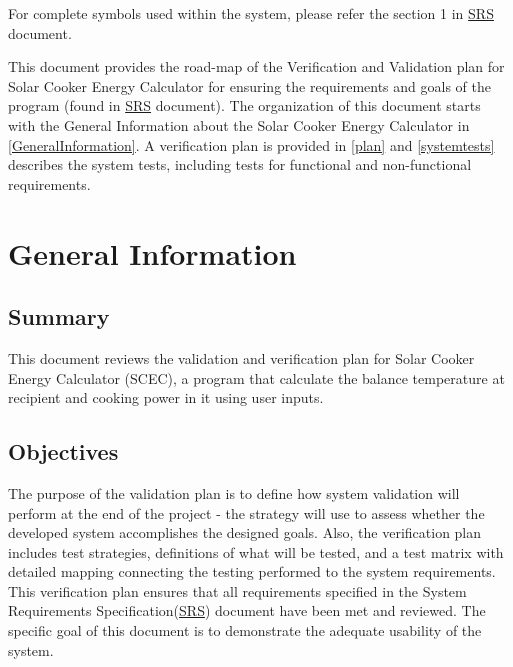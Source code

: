 \documentclass[12pt, titlepage]{article}
\begin{document}
For complete symbols used within the system, please refer the section 1 in 
  \href{https://github.com/DeeshaPatel/CAS-741-Solar-Cooker/blob/7c53c8d9a19ca2f94dfba6ba9208eae0bf03b8cc/docs/SRS/SRS.pdf}{SRS} document.


\newpage


This document provides the road-map of the Verification and Validation plan for Solar Cooker Energy Calculator for ensuring the requirements and goals of the program (found in \href{https://github.com/DeeshaPatel/CAS-741-Solar-Cooker/blob/7c53c8d9a19ca2f94dfba6ba9208eae0bf03b8cc/docs/SRS/SRS.pdf}{SRS} document). The organization of this document starts with the General Information about the Solar Cooker Energy Calculator in \autoref{GeneralInformation}. A verification plan is provided in \autoref{plan} and \autoref{systemtests} describes the system tests, including tests for functional and non-functional requirements.
  

\section{General Information}
\label{GeneralInformation}

\subsection{Summary}

This document reviews the validation and verification plan for Solar Cooker Energy Calculator (SCEC), a program that calculate the balance temperature at recipient and cooking power in it using user inputs.  

\subsection{Objectives}

The purpose of the validation plan is to define how system validation will perform at the end of the project - the strategy will use to assess whether the developed system accomplishes the designed goals. Also, the verification plan includes test strategies, definitions of what will be tested, and a test matrix with detailed mapping connecting the testing performed to the system requirements. This verification plan ensures that all requirements specified in the System Requirements Specification(\href{https://github.com/DeeshaPatel/CAS-741-Solar-Cooker/blob/7c53c8d9a19ca2f94dfba6ba9208eae0bf03b8cc/docs/SRS/SRS.pdf}{SRS}) document have been met and reviewed. The specific goal of this document is to demonstrate the adequate usability of the system.
\end{document}
